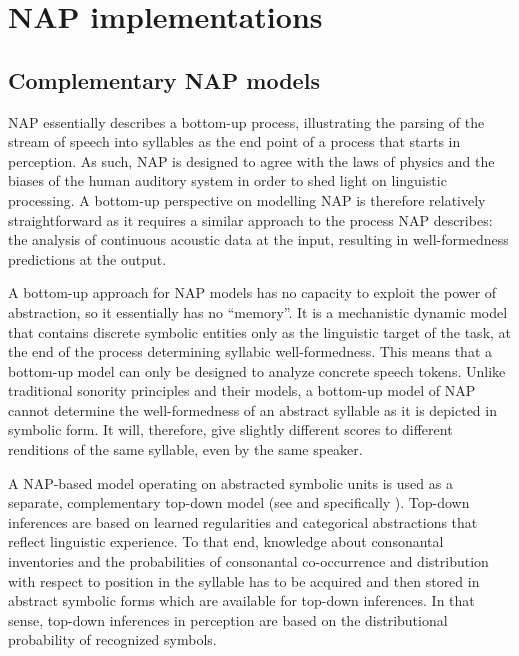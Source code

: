 \chapter{NAP implementations}\label{sec:modelimp}

\section{Complementary NAP models}\label{sec:complementary}

NAP essentially describes a bottom-up process, illustrating the parsing of the stream of speech into syllables as the end point of a process that starts in perception.
As such, NAP is designed to agree with the laws of physics and the biases of the human auditory system in order to shed light on linguistic processing.
A bottom-up perspective on modelling NAP is therefore relatively straightforward as it requires a similar approach to the process NAP describes: the analysis of continuous acoustic data at the input, resulting in well-formedness predictions at the output.

A bottom-up approach for NAP models has no capacity to exploit the power of abstraction, so it essentially has no \enquote{memory}. It is a mechanistic dynamic model that contains discrete symbolic entities only as the linguistic target of the task, at the end of the process determining syllabic well-formedness.
This means that a bottom-up model can only be designed to analyze concrete speech tokens. Unlike traditional sonority principles and their models, a bottom-up model of NAP cannot determine the well-formedness of an abstract syllable as it is depicted in symbolic form. It will, therefore, give slightly different scores to different renditions of the same syllable, even by the same speaker.

A NAP-based model operating on abstracted symbolic units is used as a separate, complementary top-down model (see  and specifically ). Top-down inferences are based on learned regularities and categorical abstractions that reflect linguistic experience. To that end, knowledge about consonantal inventories and the probabilities of consonantal co-occurrence and distribution with respect to position in the syllable has to be acquired and then stored in abstract symbolic forms which are available for top-down inferences. In that sense, top-down inferences in perception are based on the distributional probability of recognized symbols.

